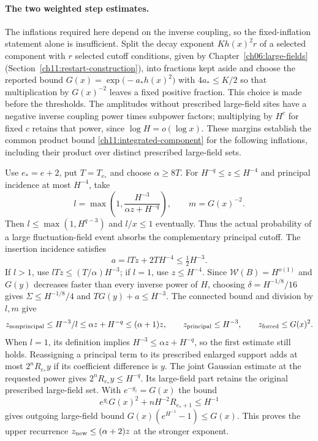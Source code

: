 \paragraph{The two weighted step estimates.}
The inflations required here depend on the inverse coupling, so the
fixed-inflation statement alone is insufficient.
Split the decay exponent $Kh(x)^2r$ of a selected component with $r$ selected cutoff conditions, given by
Chapter~\ref{ch06:large-fields} (Section~\ref{ch11:restart-construction}), into fractions kept aside and choose
the reported bound $G(x)=\exp\bigl(-a_*h(x)^2\bigr)$ with $4a_*\le K/2$ so that multiplication by $G(x)^{-2}$
leaves a fixed positive fraction. This choice is made before the
thresholds. The amplitudes without prescribed large-field sites have a negative inverse coupling power
times subpower factors; multiplying by $H^c$ for fixed $c$ retains
that power, since $\log H=o(\log x)$. These margins establish the common
product bound \eqref{ch11:integrated-component} for the following
inflations, including their product over distinct prescribed large-field sets.

Use $e_*=e+2$, put $T=T_{e_*}$ and choose $\alpha\ge8T$.
For $H^{-q}\le z\le H^{-4}$ and principal incidence at most $H^{-4}$,
take
\[
 l=\max\left(1,\frac{H^{-3}}{\alpha z+H^{-q}}\right),
 \qquad m=G(x)^{-2}.
\]
Then $l\le\max(1,H^{q-3})$ and $l/x\le1$ eventually.
Thus the actual probability of a large fluctuation-field event absorbs the complementary
principal cutoff. The insertion incidence satisfies
\[
 a=lTz+2TH^{-4}\le\tfrac12H^{-3}.
\]
If $l>1$, use $lTz\le(T/\alpha)H^{-3}$; if $l=1$, use
$z\le H^{-4}$. Since $\mathcal W(B)=H^{o(1)}$ and $G(y)$
decreases faster than every inverse power of $H$, choosing
$\delta=H^{-1/8}/16$ gives $\Sigma\le H^{-1/8}/4$ and
$TG(y)+a\le H^{-3}$.
The connected bound and division by $l,m$ give
\[
 z_{\rm nonprincipal}\le H^{-3}/l
       \le\alpha z+H^{-q}\le(\alpha+1)z,\qquad
 z_{\rm principal}\le H^{-3},\qquad
 z_{\rm forced}\le G(x)^2.
\]
When $l=1$, its definition implies
$H^{-3}\le\alpha z+H^{-q}$, so the first estimate still holds.
Reassigning a principal term to its prescribed enlarged support
adds at most $2^nR_{e_*}y$ if its coefficient difference is $y$.
The joint Gaussian estimate at the requested power gives
$2^nR_{e_*}y\le H^{-q}$.
Its large-field part retains the original
prescribed large-field set. With $e^{-g_i}=G(x)$ the bound
\[
 e^{g_i}G(x)^2+nH^{-2}R_{e_*+1}\le H^{-1}
\]
gives outgoing large-field bound
$G(x)(e^{H^{-1}}-1)\le G(x)$.
This proves the upper recurrence
$z_{\rm new}\le(\alpha+2)z$ at the stronger exponent.

